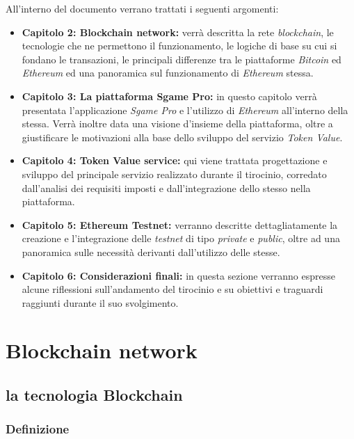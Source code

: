 \documentclass[11pt]{thesistemp}
\begin{document}
All'interno del documento verrano trattati i seguenti argomenti: 
\begin{itemize}
	\item \textbf{Capitolo 2: Blockchain network:} verrà descritta la rete \textit{blockchain}, le tecnologie che ne permettono il funzionamento, le logiche di base su cui si fondano le transazioni, le principali differenze tra le piattaforme \textit{Bitcoin} ed \textit{Ethereum} ed una panoramica sul funzionamento di \textit{Ethereum} stessa.
	\item \textbf{Capitolo 3: La piattaforma Sgame Pro:} in questo capitolo verrà presentata l'applicazione \textit{Sgame Pro} e l'utilizzo di \textit{Ethereum} all'interno della stessa. Verrà inoltre data una visione d'insieme della piattaforma, oltre a giustificare le motivazioni alla base dello sviluppo del servizio \textit{Token Value}.
	\item \textbf{Capitolo 4: Token Value service:} qui viene trattata progettazione e sviluppo del principale servizio realizzato durante il tirocinio, corredato dall'analisi dei requisiti imposti e dall'integrazione dello stesso nella piattaforma.
	\item \textbf{Capitolo 5: Ethereum Testnet:} verranno descritte dettagliatamente la creazione e l'integrazione delle \textit{testnet} di tipo \textit{private} e \textit{public}, oltre ad una panoramica sulle necessità derivanti dall'utilizzo delle stesse.
	\item \textbf{Capitolo 6: Considerazioni finali:} in questa sezione verranno espresse alcune riflessioni sull'andamento del tirocinio e su obiettivi e traguardi raggiunti durante il suo svolgimento.
\end{itemize}

\pagebreak
\section{Blockchain network}

\subsection{la tecnologia Blockchain}

\subsubsection{Definizione}
\end{document}
